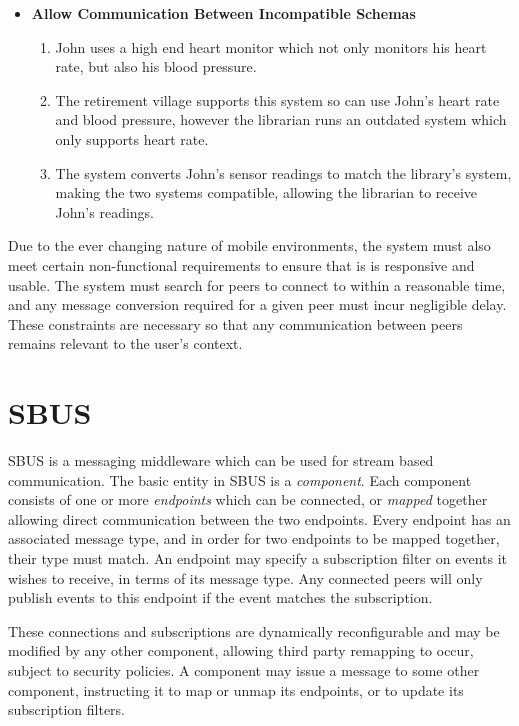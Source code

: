 \documentclass[12pt,twoside,notitlepage]{report}
\begin{document}
\begin{itemize}
\item {\bf Allow Communication Between Incompatible Schemas}

\begin{enumerate}

\item John uses a high end heart monitor which not only monitors his heart rate, but also his blood pressure.

\item The retirement village supports this system so can use John's heart rate and blood pressure, however the librarian runs an outdated system which only supports heart rate.

\item The system converts John's sensor readings to match the library's system, making the two systems compatible, allowing the librarian to receive John's readings.

\end{enumerate}

\end{itemize}

Due to the ever changing nature of mobile environments, the system must also meet certain non-functional requirements to ensure that is is responsive and usable. 
The system must search for peers to connect to within a reasonable time, and any message conversion required for a given peer must incur negligible delay.
These constraints are necessary so that any communication between peers remains relevant to the user's context.

\section{SBUS}

SBUS \cite{ingram2009reconfigurable} is a messaging middleware which can be used for stream based communication. 
The basic entity in SBUS is a {\sl component}. 
Each component consists of one or more {\sl endpoints} which can be connected, or {\sl mapped} together allowing direct communication between the two endpoints. 
Every endpoint has an associated message type, and in order for two endpoints to be mapped together, their type must match. 
An endpoint may specify a subscription filter on events it wishes to receive, in terms of its message type.
 Any connected peers will only publish events to this endpoint if the event matches the subscription.

These connections and subscriptions are dynamically reconfigurable and may be modified by any other component, allowing third party remapping to occur, subject to security policies. 
A component may issue a message to some other component, instructing it to map or unmap its endpoints, or to update its subscription filters.
\end{document}
